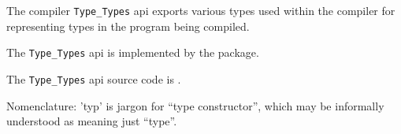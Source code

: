 
The compiler {\tt Type\_Types} api exports various types used within 
the compiler for representing types in the program being compiled.

The {\tt Type\_Types} api is implemented by the  package.

The {\tt Type\_Types} api source code is .

Nomenclature: 'typ' is jargon for ``type constructor'', which may be 
informally understood as meaning just ``type''.




